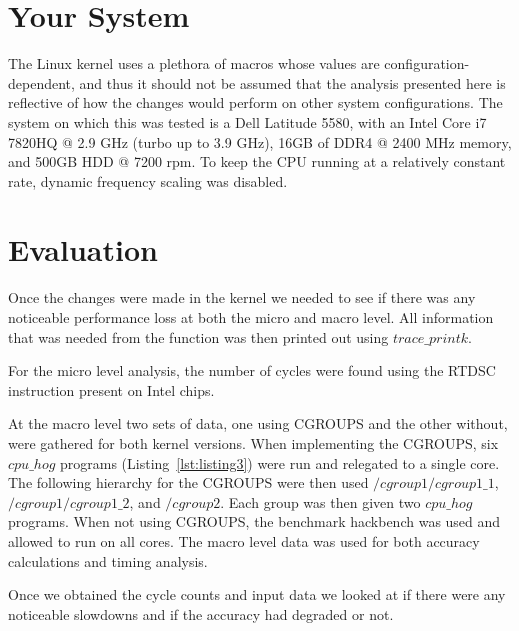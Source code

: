 \documentclass[10pt, conference]{IEEEtran}
\begin{document}




\section{Your System}

The Linux kernel uses a plethora of macros whose values are configuration-dependent, and thus it should not be assumed that the analysis presented here is reflective of how the changes would perform on other system configurations.  The system on which this was tested is a Dell Latitude 5580, with an Intel Core i7 7820HQ @ 2.9 GHz (turbo up to 3.9 GHz), 16GB of DDR4 @ 2400 MHz memory, and 500GB HDD @ 7200 rpm.  To keep the CPU running at a relatively constant rate, dynamic frequency scaling was disabled.

\section{Evaluation}
Once the changes were made in the kernel we needed to see if there was any noticeable performance loss at both the micro and macro level. All information that was needed from the function was then printed out using $trace\_printk$.

For the micro level analysis, the number of cycles were found using the RTDSC instruction present on Intel chips.

At the macro level two sets of data, one using CGROUPS and the other without, were gathered for both kernel versions. When implementing the CGROUPS, six $cpu\_hog$ programs (Listing~\ref{lst:listing3}) were run and relegated to a single core. The following hierarchy for the CGROUPS were then used $/cgroup1/cgroup1\_1$, $/cgroup1/cgroup1\_2$, and $/cgroup2$. Each group was then given two $cpu\_hog$ programs. When not using CGROUPS, the benchmark hackbench was used and allowed to run on all cores. The macro level data was used for both accuracy calculations and timing analysis.

Once we obtained the cycle counts and input data we looked at if there were any noticeable slowdowns and if the accuracy had degraded or not.
\end{document}
